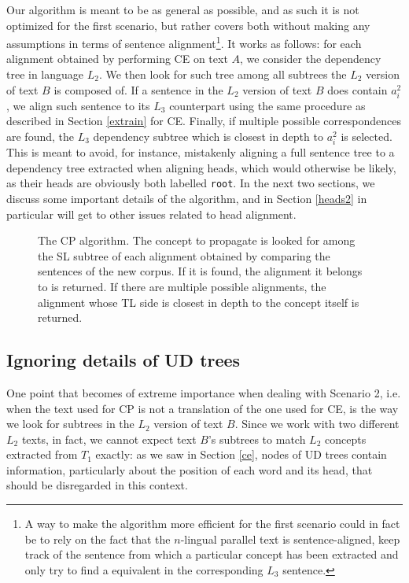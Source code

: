 Our algorithm is meant to be as general as possible, and as such it is not optimized for the first scenario, but rather covers both without making any assumptions in terms of sentence alignment\footnote{A way to make the algorithm more efficient for the first scenario could in fact be to rely on the fact that the $n$-lingual parallel text is sentence-aligned, keep track of the sentence from which a particular concept has been extracted and only try to find a equivalent in the corresponding $L_3$ sentence.}. 
It works as follows: for each alignment obtained by performing CE on text $A$, we consider the dependency tree in language $L_2$. We then look for such tree among all subtrees the $L_2$ version of text $B$ is composed of. If a sentence in the $L_2$ version of text $B$ does contain $a_i^2$, we align such sentence to its $L_3$ counterpart using the same procedure as described in Section \ref{extrain} for CE. Finally, if multiple possible correspondences are found, the $L_3$ dependency subtree which is closest in depth to $a_i^2$ is selected. This is meant to avoid, for instance, mistakenly aligning a full sentence tree to a dependency tree extracted when aligning heads, which would otherwise be likely, as their heads are obviously both labelled \texttt{root}. In the next two sections, we discuss some important details of the algorithm, and in Section \ref{heads2} in particular will get to other issues related to head alignment.

\begin{figure}[H]
    \centering
    
    \caption[The CP algorithm]{The CP algorithm. The concept to propagate is looked for among the SL subtree of each alignment obtained by comparing the sentences of the new corpus. If it is found, the alignment it belongs to is returned. If there are multiple possible alignments, the alignment whose TL side is closest in depth to the concept itself is returned.}
    \label{prop}
\end{figure}

\subsection{Ignoring details of UD trees}
One point that becomes of extreme importance when dealing with Scenario 2, i.e. when the text used for CP is not a translation of the one used for CE, is the way we look for subtrees in the $L_2$ version of text $B$. Since we work with two different $L_2$ texts, in fact, we cannot expect text $B$'s subtrees to match $L_2$ concepts extracted from $T_1$ exactly: as we saw in Section \ref{ce}, nodes of UD trees contain information, particularly about the position of each word and its head, that should be disregarded in this context.\smallskip 

